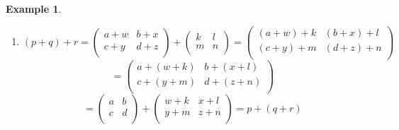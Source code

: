 \documentclass[11pt,a4paper]{article}
\theoremstyle{definition}
\newtheorem{exa}[thm]{Example}
\begin{document}
\begin{exa}
\begin{enumerate}
\begin{enumerate}
      
      \item[(ii)] $(p + q) + r = \begin{pmatrix}
      a + w & b + x\\
      c + y & d + z\\
      \end{pmatrix} + \begin{pmatrix}
      k & l\\
      m & n\\
      \end{pmatrix} = \begin{pmatrix}
      (a + w) + k & (b + x) + l\\
      (c + y) + m & (d + z) + n\\
      \end{pmatrix}$\\ $$ = \begin{pmatrix}
      a + (w + k) & b + (x + l)\\
      c + (y + m) & d + (z + n)\\
      \end{pmatrix}$$
      $$ = \begin{pmatrix}
      a & b\\
      c & d\\
      \end{pmatrix} + \begin{pmatrix}
      w + k & x + l\\
      y + m & z + n\\
      \end{pmatrix} = p + (q + r)$$\\
      

\end{enumerate}
\end{enumerate}
\end{exa}
\end{document}
